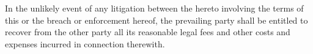 In the unlikely event of any litigation between the \parties hereto involving the terms of this \lease or the breach or enforcement hereof, the prevailing party shall be entitled to recover from the other party all its reasonable legal fees and other costs and expenses incurred in connection therewith.

